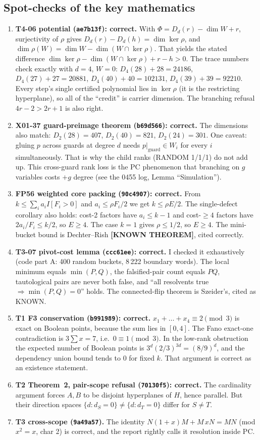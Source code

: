 \documentclass[11pt]{article}
\theoremstyle{definition}
\theoremstyle{remark}
\newcommand{\lab}[1]{\textbf{[#1]}}
\begin{document}
\subsection{Spot-checks of the key mathematics}
\begin{enumerate}
\item \textbf{T4-06 potential (\texttt{ae7b13f}): correct.} With $\Phi=D_d(r)-\dim W+r$,
surjectivity of $\rho$ gives $D_d(r)-D_d(h)=\dim\ker\rho$, and
$\dim\rho(W)=\dim W-\dim(W\cap\ker\rho)$. That yields the stated difference
$\dim\ker\rho-\dim(W\cap\ker\rho)+r-h>0$. The trace numbers check exactly with $d=4$, $W=0$:
$D_4(28)+28=24186$, $D_4(27)+27=20881$, $D_4(40)+40=102131$, $D_4(39)+39=92210$. Every
step's single certified polynomial lies in $\ker\rho$ (it is the restricting hyperplane),
so all of the ``credit'' is carrier dimension. The branching refusal $4r-2>2r+1$ is also
right.
\item \textbf{X01-37 guard-preimage theorem (\texttt{b69d566}): correct.} The dimensions also
match: $D_2(28)=407$, $D_2(40)=821$, $D_2(24)=301$. One caveat: gluing $p$ across guards
at degree $d$ needs $p|_{\text{guard}}\in W_i$ for every $i$ simultaneously. That is why
the child ranks (RANDOM 1/1/1) do not add up. This cross-guard rank loss is
the PC phenomenon that branching on $g$ variables costs $+g$ degree (see the 0455 log,
Lemma ``Simulation'').
\item \textbf{FP56 weighted core packing (\texttt{90c4907}): correct.} From
$k\le\sum_i a_iI[F_i>0]$ and $a_i\le\rho F_i/2$ we get $k\le\rho E/2$. The single-defect
corollary also holds: cost-2 factors have $a_i\le k-1$ and cost-$\ge4$ factors have
$2a_i/F_i\le k/2$, so $E\ge4$. The case $k=1$ gives $\rho\le1/2$, so $E\ge4$. The
mini-bucket bound is Dechter--Rish \lab{KNOWN THEOREM}, cited correctly.
\item \textbf{T3-07 pivot-cost lemma (\texttt{ccc61ee}): correct.} I checked it exhaustively
(code part A: 400 random buckets, 8\,222 boundary words). The local minimum equals
$\min(P,Q)$, the falsified-pair count equals $PQ$, tautological pairs are never both
false, and ``all resolvents true $\Rightarrow\min(P,Q)=0$'' holds. The connected-flip
theorem is Szeider's, cited as KNOWN.
\item \textbf{T1 F3 conservation (\texttt{b991989}): correct.} $x_1{+}\dots{+}x_4\equiv2
\pmod 3$ is exact on Boolean points, because the sum lies in $[0,4]$. The Fano exact-one
contradiction is $3\sum x=7$, i.e.\ $0\equiv1\pmod 3$. In the low-rank obstruction the
expected number of Boolean points is $3^d(2/3)^{3d}=(8/9)^d$, and the dependency union
bound tends to 0 for fixed $k$. That argument is correct as an existence statement.
\item \textbf{T2 Theorem~2, pair-scope refusal (\texttt{70130f5}): correct.} The cardinality
argument forces $A,B$ to be disjoint hyperplanes of $H$, hence parallel. But their
direction spaces $\{d:d_S=0\}\ne\{d:d_T=0\}$ differ for $S\ne T$.
\item \textbf{T3 cross-scope (\texttt{9a49a57}).} The identity $N(1{+}x)M+M\,xN=MN$
(mod $x^2{=}x$, char 2) is correct, and the report rightly calls it resolution inside PC.
\end{enumerate}
\end{document}
